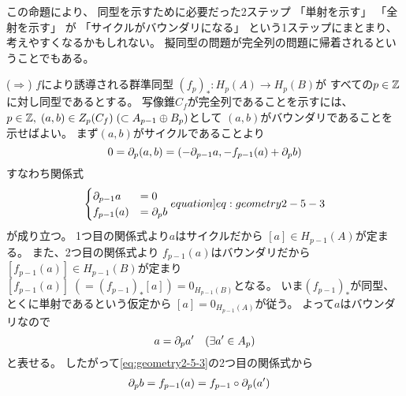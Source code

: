 \documentclass[report]{jlreq}
\begin{document}

\begin{remark}
    この命題により、
    同型を示すために必要だった2ステップ
    「単射を示す」
    「全射を示す」
    が
    「サイクルがバウンダリになる」
    という1ステップにまとまり、考えやすくなるかもしれない。
    擬同型の問題が完全列の問題に帰着されるということでもある。
\end{remark}

\begin{answer}
    ($\Rightarrow$) \quad
    $f$により誘導される群準同型
    $(f_{p})_* \colon H_p(A) \to H_p(B)$が
    すべての$p \in \mathbb{Z}$に対し同型であるとする。
    写像錐$C_f$が完全列であることを示すには、
    $p \in \mathbb{Z}, \;
    (a, b) \in Z_p(C_f) \; (\subset A_{p - 1} \oplus B_p)$として
    $(a, b)$がバウンダリであることを示せばよい。
    まず$(a, b)$がサイクルであることより
    \begin{equation}
        0 = \partial_{p} (a, b)
            = (- \partial_{p - 1} a, - f_{p - 1}(a) + \partial_{p} b)
    \end{equation}
    すなわち関係式
    \begin{equation}
        \begin{cases}
            \del_{p - 1} a &= 0 \\
            f_{p - 1}(a) &= \del_{p} b
        \end{cases}
        \label[equation]{eq:geometry2-5-3}
    \end{equation}
    が成り立つ。
    1つ目の関係式より$a$はサイクルだから
    $[a] \in H_{p - 1}(A)$が定まる。
    また、2つ目の関係式より
    $f_{p - 1}(a)$はバウンダリだから
    $[f_{p - 1}(a)] \in H_{p - 1}(B)$が定まり
    $[f_{p - 1}(a)] \; (= (f_{p - 1})_* [a]) = 0_{H_{p - 1}(B)}$となる。
    いま$(f_{p - 1})_*$が同型、とくに単射であるという仮定から
    $[a] = 0_{H_{p - 1}(A)}$が従う。
    よって$a$はバウンダリなので
    \begin{equation}
        a = \partial_{p} a' \quad (\exists a' \in A_{p})
    \end{equation}
    と表せる。
    したがって\cref{eq:geometry2-5-3}の2つ目の関係式から
    \begin{align}
        &\del_p b
            = f_{p - 1}(a)
            = f_{p - 1} \circ \del_{p} (a')

\end{align}
\end{answer}
\end{document}
